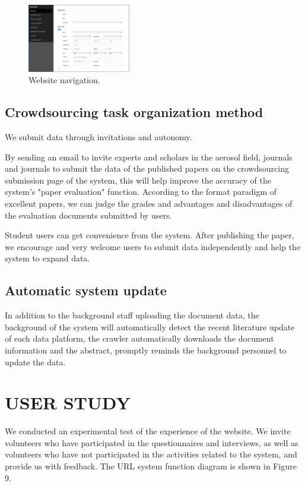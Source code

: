 \begin{figure}
	\includegraphics[width=0.4\textwidth]{figures/pic8.pdf}
	\caption{Website navigation.}
\end{figure}

\subsection{Crowdsourcing task organization method}
We submit data through invitations and autonomy.

By sending an email to invite experts and scholars in the aerosol field, journals and journals to submit the data of the published papers on the crowdsourcing submission page of the system, this will help improve the accuracy of the system's "paper evaluation" function. According to the format paradigm of excellent papers, we can judge the grades and advantages and disadvantages of the evaluation documents submitted by users.

Student users can get convenience from the system. After publishing the paper, we encourage and very welcome users to submit data independently and help the system to expand data.

\subsection{Automatic system update}
In addition to the background staff uploading the document data, the background of the system will automatically detect the recent literature update of each data platform, the crawler automatically downloads the document information and the abstract, promptly reminds the background personnel to update the data.

\section{USER STUDY}
We conducted an experimental test of the experience of the website. We invite volunteers who have participated in the questionnaires and interviews, as well as volunteers who have not participated in the activities related to the system, and provide us with feedback. The URL system function diagram is shown in Figure 9.

